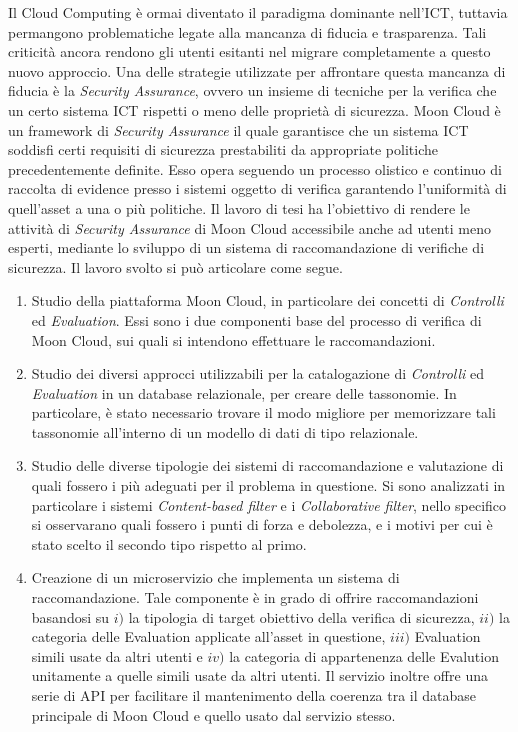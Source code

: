 \documentclass[10pt,a4paper]{article}
\begin{document}
\hfill\break
Il Cloud Computing è ormai diventato il paradigma dominante nell'ICT, tuttavia permangono problematiche legate alla mancanza di fiducia e trasparenza.
Tali criticità ancora rendono gli utenti esitanti nel migrare completamente a questo nuovo approccio.
Una delle strategie utilizzate per affrontare questa mancanza di fiducia è la \textit{Security Assurance}, ovvero un insieme di tecniche
per la verifica che un certo sistema ICT rispetti o meno delle proprietà di sicurezza.\hfill\break 
%
Moon Cloud è un framework di \textit{Security Assurance} il quale garantisce che un sistema ICT soddisfi certi requisiti di sicurezza 
prestabiliti da appropriate politiche precedentemente definite. Esso opera seguendo un processo olistico e continuo di raccolta di evidence presso i 
sistemi oggetto di verifica garantendo l'uniformità di quell'asset a una o più politiche.\hfill\break
%
Il lavoro di tesi ha l'obiettivo di rendere le attività di \textit{Security Assurance} di Moon Cloud accessibile anche ad utenti meno esperti,
mediante lo sviluppo di un sistema di raccomandazione di verifiche di sicurezza. Il lavoro svolto si può articolare come segue.
\begin{enumerate}
    \item Studio della piattaforma Moon Cloud, in particolare dei concetti di \textit{Controlli} ed \textit{Evaluation}.
    Essi sono i due componenti base del processo di verifica di Moon Cloud, sui quali si intendono effettuare le raccomandazioni.
    \item Studio dei diversi approcci utilizzabili per la catalogazione di \textit{Controlli} ed \textit{Evaluation} in un database
    relazionale, per creare delle tassonomie. In particolare, è stato necessario trovare il modo migliore per memorizzare tali tassonomie all'interno
    di un modello di dati di tipo relazionale.
    \item Studio delle diverse tipologie dei sistemi di raccomandazione e valutazione di quali fossero i più adeguati per il problema in questione.
    Si sono analizzati in particolare i sistemi \textit{Content-based filter} e i \textit{Collaborative filter}, nello specifico si osservarano quali
    fossero i punti di forza e debolezza, e i motivi per cui è stato scelto il secondo tipo rispetto al primo.
    \item Creazione di un microservizio che implementa un sistema di raccomandazione. Tale componente è in grado di offrire raccomandazioni basandosi
    su $i)$ la tipologia di target obiettivo della verifica di sicurezza, $ii)$ la categoria delle Evaluation applicate all’asset in questione, $iii)$ 
    Evaluation simili usate da altri utenti e $iv)$ la categoria di appartenenza delle Evalution unitamente a quelle simili usate da altri utenti.
    Il servizio inoltre offre una serie di API per facilitare il mantenimento della coerenza tra il database principale di Moon Cloud e quello
    usato dal servizio stesso.
\end{enumerate}
\end{document}
